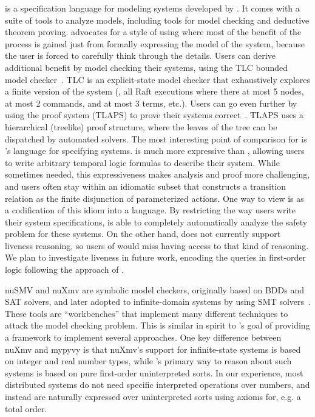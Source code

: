 \TLA is a specification language for modeling systems
developed by \citet{lamport:tla,lamport:specifying-systems}.
%
It comes with a suite of tools to analyze models,
including tools for model checking and deductive theorem proving.
%
\citeauthor{lamport:tla} advocates for a style of using \TLA
where most of the benefit of the process is gained
just from formally expressing the model of the system,
because the user is forced to carefully think through the details.
%
Users can derive additional benefit by model checking their systems,
using the TLC bounded model checker~\cite{tlc}.
%
TLC is an explicit-state model checker that exhaustively explores
a finite version of the system (\eg, all Raft executions where
there at most 5 nodes, at most 2 commands, and at most 3 terms, etc.).
%
Users can go even further by using the \TLA proof system (TLAPS)
to prove their systems correct~\cite{tlaps}.
%
TLAPS uses a hierarchical (treelike) proof structure,
where the leaves of the tree can be dispatched by automated solvers.
%
The most interesting point of comparison for \mypyvy is
\TLA's language for specifying systems.
%
\TLA is much more expressive than \mypyvy,
allowing users to write arbitrary temporal logic formulas
to describe their system.
%
While sometimes needed, this expressiveness makes
analysis and proof more challenging,
and users often stay within an idiomatic subset that
constructs a transition relation as the finite disjunction of
parameterized actions.
%
One way to view \mypyvy is as a codification of this idiom into a language.
%
By restricting the way users write their system specifications,
\mypyvy is able to completely automatically analyze
the safety problem for these systems.
%
On the other hand, \mypyvy does not currently support liveness reasoning,
so users of \TLA would miss having access to that kind of reasoning.
%
We plan to investigate liveness in future work,
encoding the queries in first-order logic
following the approach of \citet{padon:reducing-liveness}.

nuSMV and nuXmv are symbolic model checkers,
originally based on BDDs and SAT solvers,
and later adopted to infinite-domain systems
by using SMT solvers~\cite{nusmv,nusmv2,nuxmv}.
%
These tools are ``workbenches'' that implement many different techniques
to attack the model checking problem.
%
This is similar in spirit to \mypyvy's goal of
providing a framework to implement several approaches.
%
One key difference between nuXmv and mypyvy is that
nuXmv's support for infinite-state systems
is based on integer and real number types,
while \mypyvy's primary way to reason about such systems
is based on pure first-order uninterpreted sorts.
%
In our experience, most distributed systems do not need
specific interpreted operations over numbers,
and instead are naturally expressed over uninterpreted sorts
using axioms for, e.g. a total order.

